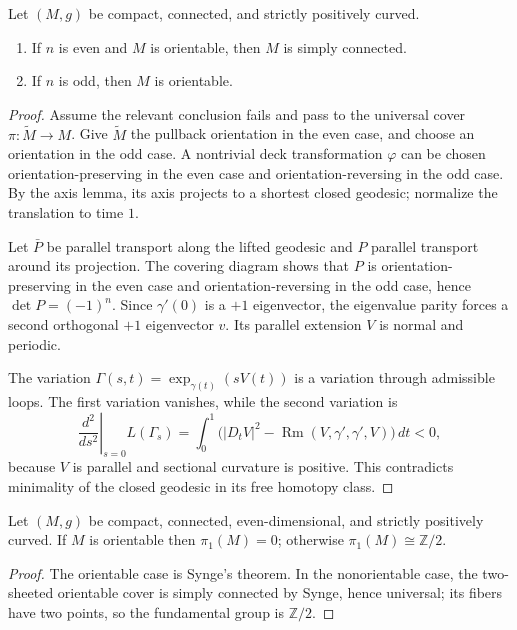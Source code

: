 \begin{theorem}[Synge]
\label{thm:synge-positive-sectional}
Let $(M,g)$ be compact, connected, and strictly positively curved.
\begin{enumerate}
\item[(a)] If $n$ is even and $M$ is orientable, then $M$ is simply connected.
\item[(b)] If $n$ is odd, then $M$ is orientable.
\end{enumerate}
\end{theorem}

\begin{proof}
\sketch
Assume the relevant conclusion fails and pass to the universal cover
$\pi:\widetilde M\to M$.  Give $\widetilde M$ the pullback orientation in
the even case, and choose an orientation in the odd case.  A nontrivial deck
transformation $\varphi$ can be chosen orientation-preserving in the even case
and orientation-reversing in the odd case.  By the axis lemma, its axis projects
to a shortest closed geodesic; normalize the translation to time $1$.

Let $\bar P$ be parallel transport along the lifted geodesic and $P$ parallel
transport around its projection.  The covering diagram shows that $P$ is
orientation-preserving in the even case and orientation-reversing in the odd
case, hence $\det P=(-1)^n$.  Since $\gamma'(0)$ is a $+1$ eigenvector, the
eigenvalue parity forces a second orthogonal $+1$ eigenvector $v$.  Its parallel
extension $V$ is normal and periodic.

The variation $\Gamma(s,t)=\exp_{\gamma(t)}(sV(t))$ is a variation through
admissible loops.  The first variation vanishes, while the second variation is
\[
\left.\frac{d^2}{ds^2}\right|_{s=0}L(\Gamma_s)
=\int_0^1\bigl(|D_tV|^2-\operatorname{Rm}(V,\gamma',\gamma',V)\bigr)\,dt<0,
\]
because $V$ is parallel and sectional curvature is positive.  This contradicts
minimality of the closed geodesic in its free homotopy class.
\end{proof}

\begin{corollary}
\label{cor:fundamental-groups-even-dimension}

Let $(M,g)$ be compact, connected, even-dimensional, and strictly positively
curved.  If $M$ is orientable then $\pi_1(M)=0$; otherwise
$\pi_1(M)\cong\mathbb Z/2$.
\end{corollary}

\begin{proof}
\sketch
The orientable case is Synge's theorem.  In the nonorientable case, the
two-sheeted orientable cover is simply connected by Synge, hence universal;
its fibers have two points, so the fundamental group is $\mathbb Z/2$.
\end{proof}
